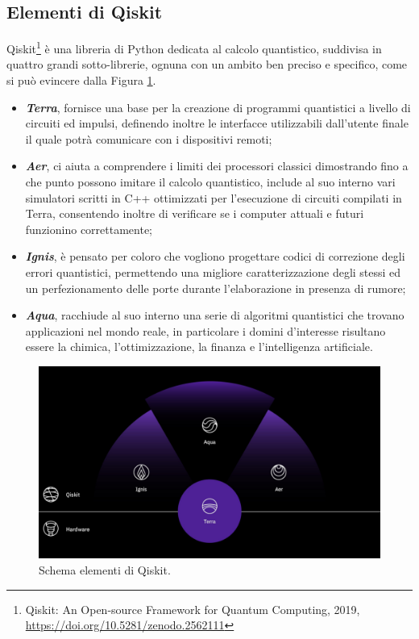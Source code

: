 \subsection{Elementi di Qiskit}
Qiskit\footnote{Qiskit: An Open-source Framework for Quantum Computing, 2019, \url{https://doi.org/10.5281/zenodo.2562111}}  è una libreria di Python dedicata al calcolo quantistico, suddivisa in quattro grandi sotto-librerie, ognuna con un ambito ben preciso e specifico, come si può evincere dalla Figura \ref{fig:elementi_qiskit}.
\begin{itemize}
    \renewcommand\labelitemi{--}
    \item \textbf{\textit{Terra}}, fornisce una base per la creazione di programmi quantistici a livello di circuiti ed impulsi, definendo inoltre le interfacce utilizzabili dall'utente finale il quale potrà comunicare con i dispositivi remoti;
    \item \textbf{\textit{Aer}}, ci aiuta a comprendere i limiti dei processori classici dimostrando fino a che punto possono imitare il calcolo quantistico, include al suo interno vari simulatori scritti in C++ ottimizzati per l'esecuzione di circuiti compilati in Terra, consentendo inoltre di verificare se i computer attuali e futuri funzionino correttamente;
    \item \textbf{\textit{Ignis}}, è pensato per coloro che vogliono progettare codici di correzione degli errori quantistici, permettendo una migliore caratterizzazione degli stessi ed un perfezionamento delle porte durante l'elaborazione in presenza di rumore;
    \item \textbf{\textit{Aqua}}, racchiude al suo interno una serie di algoritmi quantistici che trovano applicazioni nel mondo reale, in particolare i domini d'interesse risultano essere la chimica, l'ottimizzazione, la finanza e l'intelligenza artificiale.
\end{itemize}
\begin{figure}[htp]
    \centering
    \includegraphics[width=13cm]{Images/Capitolo3/elementi_qiskit.png}
    \caption{Schema elementi di Qiskit.}
    \label{fig:elementi_qiskit}
\end{figure}

